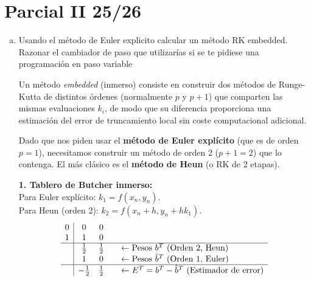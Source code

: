 \chapter{Parcial II 25/26} 
\begin{enumerate}[a)]
    \item Usando el método de Euler explicito calcular un método RK embedded. Razonar el cambiador de paso que utilizarías si se te pidiese una programación en paso variable

    \begin{sol}
        
Un método \textit{embedded} (inmerso) consiste en construir dos métodos de Runge-Kutta de distintos órdenes (normalmente $p$ y $p+1$) que comparten las mismas evaluaciones $k_i$, de modo que su diferencia proporciona una estimación del error de truncamiento local sin coste computacional adicional.

Dado que nos piden usar el \textbf{método de Euler explícito} (que es de orden $p=1$), necesitamos construir un método de orden 2 ($p+1=2$) que lo contenga. El más clásico es el \textbf{método de Heun} (o RK de 2 etapas). 

\vspace{0.3cm}
\noindent \textbf{1. Tablero de Butcher inmerso:} \\
Para Euler explícito: $k_1 = f(x_n, y_n)$. \\
Para Heun (orden 2): $k_2 = f(x_n + h, y_n + h k_1)$.
\[
\begin{array}{c|ccl}
0 & 0 & 0 \\
1 & 1 & 0 \\
\hline
  & \frac{1}{2} & \frac{1}{2} & \quad \leftarrow \text{Pesos } b^T \text{ (Orden 2, Heun)} \\
  & 1 & 0 & \quad \leftarrow \text{Pesos } \hat{b}^T \text{ (Orden 1, Euler)} \\
\hline
  & -\frac{1}{2} & \frac{1}{2} & \quad \leftarrow E^T = b^T - \hat{b}^T \text{ (Estimador de error)}
\end{array}
\]


\end{sol}
\end{enumerate}
